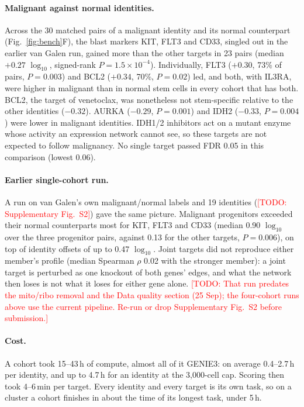 \documentclass[unnumsec,webpdf,contemporary,large]{oup-authoring-template}
\newcommand{\todo}[1]{\textcolor{red}{[TODO: #1]}}
\begin{document}
\paragraph{Malignant against normal identities.} Across the 30 matched pairs of a malignant identity and its normal counterpart (Fig.~\ref{fig:bench}F), the blast markers KIT, FLT3 and CD33, singled out in the earlier van Galen run, gained more than the other targets in 23 pairs (median $+0.27$ $\log_{10}$, signed-rank $P=1.5\times10^{-4}$). Individually, FLT3 ($+0.30$, 73\% of pairs, $P=0.003$) and BCL2 ($+0.34$, 70\%, $P=0.02$) led, and both, with IL3RA, were higher in malignant than in normal stem cells in every cohort that has both. BCL2, the target of venetoclax, was nonetheless not stem-specific relative to the other identities ($-0.32$). AURKA ($-0.29$, $P=0.001$) and IDH2 ($-0.33$, $P=0.004$) were lower in malignant identities. IDH1/2 inhibitors act on a mutant enzyme whose activity an expression network cannot see, so these targets are not expected to follow malignancy. No single target passed FDR 0.05 in this comparison (lowest 0.06).

\paragraph{Earlier single-cohort run.} A run on van Galen's own malignant/normal labels and 19 identities (\todo{Supplementary Fig.~S2}) gave the same picture. Malignant progenitors exceeded their normal counterparts most for KIT, FLT3 and CD33 (median 0.90 $\log_{10}$ over the three progenitor pairs, against 0.13 for the other targets, $P=0.006$), on top of identity offsets of up to 0.47 $\log_{10}$. Joint targets did not reproduce either member's profile (median Spearman $\rho$ 0.02 with the stronger member): a joint target is perturbed as one knockout of both genes' edges, and what the network then loses is not what it loses for either gene alone. \todo{That run predates the mito/ribo removal and the Data quality section (25 Sep); the four-cohort runs above use the current pipeline. Re-run or drop Supplementary Fig.~S2 before submission.}

\paragraph{Cost.} A cohort took 15--43\,h of compute, almost all of it GENIE3: on average 0.4--2.7\,h per identity, and up to 4.7\,h for an identity at the 3,000-cell cap. Scoring then took 4--6\,min per target. Every identity and every target is its own task, so on a cluster a cohort finishes in about the time of its longest task, under 5\,h.
\end{document}
